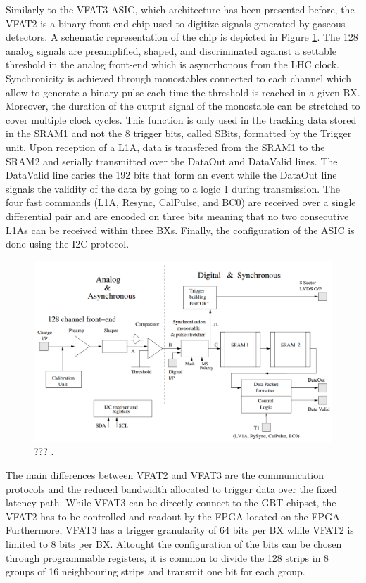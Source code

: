       Similarly to the VFAT3 ASIC, which architecture has been presented before, the VFAT2 is a binary front-end chip used to digitize signals generated by gaseous detectors. A schematic representation of the chip is depicted in Figure \ref{fig:II-2-daq-vfat2}. The 128 analog signals are preamplified, shaped, and discriminated against a settable threshold in the analog front-end which is asyncrhonous from the LHC clock. Synchronicity is achieved through monostables connected to each channel which allow to generate a binary pulse each time the threshold is reached in a given BX. Moreover, the duration of the output signal of the monostable can be stretched to cover multiple clock cycles. This function is only used in the tracking data stored in the SRAM1 and not the 8 trigger bits, called SBits, formatted by the Trigger unit. Upon reception of a L1A, data is transfered from the SRAM1 to the SRAM2 and serially transmitted over the DataOut and DataValid lines. The DataValid line caries the 192 bits that form an event while the DataOut line signals the validity of the data by going to a logic 1 during transmission. The four fast commands (L1A, Resync, CalPulse, and BC0) are received over a single differential pair and are encoded on three bits meaning that no two consecutive L1As can be received within three BXs. Finally, the configuration of the ASIC is done using the I2C protocol. \\

      \begin{figure}[h!]
        \centering
        \includegraphics[width=\textwidth]{img/II-2-daq/vfat2.png}
        \caption{??? \cite{Aspell:1069906}.}
        \label{fig:II-2-daq-vfat2}
      \end{figure}

      The main differences between VFAT2 and VFAT3 are the communication protocols and the reduced bandwidth allocated to trigger data over the fixed latency path. While VFAT3 can be directly connect to the GBT chipset, the VFAT2 has to be controlled and readout by the FPGA located on the FPGA. Furthermore, VFAT3 has a trigger granularity of 64 bits per BX while VFAT2 is limited to 8 bits per BX. Altought the configuration of the bits can be chosen through programmable registers, it is common to divide the 128 strips in 8 groups of 16 neighbouring strips and transmit one bit for each group. \\


